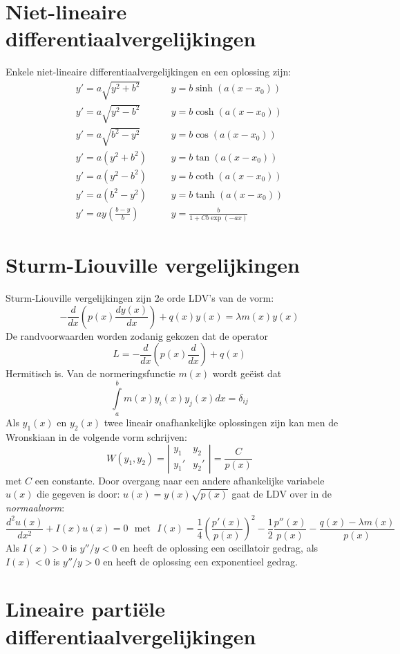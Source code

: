 \section{Niet-lineaire differentiaalvergelijkingen}
Enkele niet-lineaire differentiaalvergelijkingen en een oplossing zijn:
\[
\begin{array}{lll}
y'=a\sqrt{y^2+b^2}&~~~~&y=b\sinh(a(x-x_0))\\
y'=a\sqrt{y^2-b^2}&~~~~&y=b\cosh(a(x-x_0))\\
y'=a\sqrt{b^2-y^2}&~~~~&y=b\cos(a(x-x_0))\\
y'=a(y^2+b^2)     &~~~~&y=b\tan(a(x-x_0))\\
y'=a(y^2-b^2)     &~~~~&y=b\coth(a(x-x_0))\\
y'=a(b^2-y^2)     &~~~~&y=b\tanh(a(x-x_0))\\
\displaystyle y'=ay\left(\frac{b-y}{b}\right)&~~~~&\displaystyle y=\frac{b}{1+Cb\exp(-ax)}
\end{array}
\]

\section{Sturm-Liouville vergelijkingen}
Sturm-Liouville vergelijkingen zijn 2e orde LDV's van de vorm:
\[
-\frac{d}{dx}\left(p(x)\frac{dy(x)}{dx}\right)+q(x)y(x)=\lambda m(x)y(x)
\]
De randvoorwaarden worden zodanig gekozen dat de operator
\[
L=-\frac{d}{dx}\left(p(x)\frac{d}{dx}\right)+q(x)
\]
Hermitisch is. Van de normeringsfunctie $m(x)$ wordt ge\"eist dat
\[
\int\limits_a^bm(x)y_i(x)y_j(x)dx=\delta_{ij}
\]
Als $y_1(x)$ en $y_2(x)$ twee lineair onafhankelijke oplossingen zijn kan men
de Wronskiaan in de volgende vorm schrijven:
\[
W(y_1,y_2)=\left|\begin{array}{cc}y_1&y_2\\ y_1'&y_2' \end{array}\right|=
\frac{C}{p(x)}
\]
met $C$ een constante. Door overgang naar een andere afhankelijke variabele
$u(x)$ die gegeven is door: $u(x)=y(x)\sqrt{p(x)}$ gaat de LDV over in de
{\it normaalvorm}:
\[
\frac{d^2u(x)}{dx^2}+I(x)u(x)=0~~~\mbox{met}~~~
I(x)=\frac{1}{4}\left(\frac{p'(x)}{p(x)}\right)^2-\frac{1}{2}\frac{p''(x)}{p(x)}-\frac{q(x)-\lambda m(x)}{p(x)}
\]
Als $I(x)>0$ is $y''/y<0$ en heeft de oplossing een oscillatoir gedrag, als
$I(x)<0$ is $y''/y>0$ en heeft de oplossing een exponentieel gedrag.

\section{Lineaire parti\"ele differentiaalvergelijkingen}
